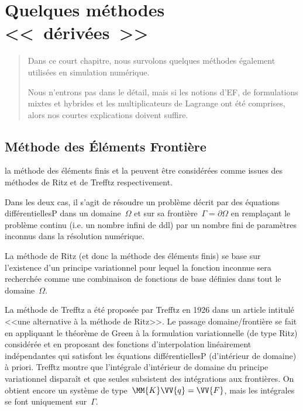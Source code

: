 \chapter{Quelques méthodes <<~dérivées~>>}\label{Ch-XFEM}
\begin{abstract}
Dans ce court chapitre, nous survolons quelques méthodes également utilisées
en simulation numérique.

Nous n'entrons pas dans le détail, mais si les notions d'EF, de formulations
mixtes et hybrides et les multiplicateurs de Lagrange ont été comprises, alors nos courtes
explications doivent suffire.
\end{abstract}


\medskip
\section{Méthode des Éléments Frontière}\label{Sec-BEM}

la méthode des éléments finis et la  
peuvent être
considérées comme issues des méthodes de Ritz 
et de Trefftz respectivement.

Dans les deux cas, il s'agit de résoudre un problème décrit par des équations différentiellesP dans un
domaine~$\Omega$ et sur sa frontière~$\Gamma=\partial\Omega$ en remplaçant
le problème continu (i.e. un nombre infini de ddl) par un nombre fini de paramètres inconnus 
dans la résolution numérique.

\medskip
La méthode de Ritz (et donc la méthode des éléments finis) se base sur 
l'existence d'un principe variationnel pour lequel la fonction inconnue sera recherchée comme une 
combinaison de fonctions de base définies dans tout le domaine~$\Omega$.

\medskip
La méthode de Trefftz a été proposée 
par Trefftz en 1926 dans un article intitulé <<une alternative à la méthode de Ritz>>. 
Le passage domaine/frontière se fait en appliquant le théorème de Green 
à la formulation variationnelle (de type Ritz) 
considérée et en proposant des fonctions d'interpolation linéairement indépendantes
qui satisfont les équations différentiellesP (d'intérieur de domaine) à priori.
Trefftz montre que l'intégrale d'intérieur de domaine du principe variationnel disparaît et que
seules subsistent des intégrations aux frontières. 
On obtient encore un système de type~$\MM{K}\VV{q}=\VV{F}$, mais les intégrales se font uniquement
sur~$\Gamma$.

